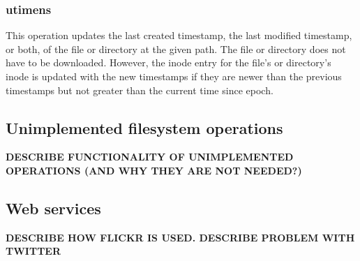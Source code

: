 \subsubsection{utimens}
This operation updates the last created timestamp, the last modified timestamp, or both, of the file or directory at the given path. The file or directory does not have to be downloaded. However, the inode entry for the file's or directory's inode is updated with the new timestamps if they are newer than the previous timestamps but not greater than the current time since epoch.

\subsection{Unimplemented filesystem operations}
\textbf{DESCRIBE FUNCTIONALITY OF UNIMPLEMENTED OPERATIONS (AND WHY THEY ARE NOT NEEDED?)}

\subsection{Web services}
\textbf{DESCRIBE HOW FLICKR IS USED. DESCRIBE PROBLEM WITH TWITTER}


